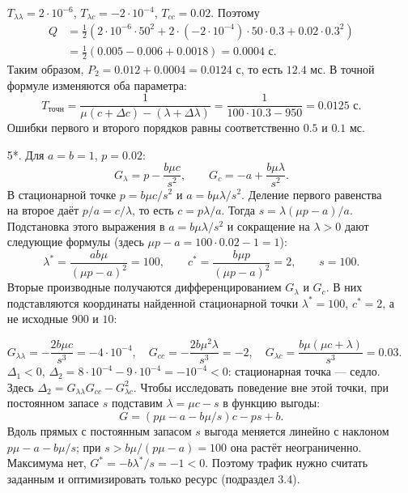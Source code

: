 \documentclass[12pt,a4paper]{article}
\begin{document}
\begin{enumerate}
$T_{\lambda\lambda}=2\cdot10^{-6}$, $T_{\lambda c}=-2\cdot10^{-4}$,
$T_{cc}=0.02$. Поэтому
\[
\begin{aligned}
Q&=\frac12\left(2\cdot10^{-6}\cdot50^2
+2\cdot(-2\cdot10^{-4})\cdot50\cdot0.3+0.02\cdot0.3^2\right)\\
&=\frac12(0.005-0.006+0.0018)=0.0004\text{ с}.
\end{aligned}
\]
Таким образом, $P_2=0.012+0.0004=0.0124$ с, то есть $12.4$ мс.
В точной формуле изменяются оба параметра:
\[
T_{\mathrm{точн}}=\frac1{\mu(c+\Delta c)-(\lambda+\Delta\lambda)}
=\frac1{100\cdot10.3-950}=0.0125\text{ с}.
\]
Ошибки первого и второго порядков равны соответственно $0.5$ и $0.1$ мс.
\item[5*.] Для $a=b=1$, $p=0.02$:
\[
G_\lambda=p-\frac{b\mu c}{s^2},\qquad G_c=-a+\frac{b\mu\lambda}{s^2}.
\]
В стационарной точке $p=b\mu c/s^2$ и $a=b\mu\lambda/s^2$.
Деление первого равенства на второе даёт $p/a=c/\lambda$, то есть
$c=p\lambda/a$. Тогда $s=\lambda(\mu p-a)/a$.
Подстановка этого выражения в $a=b\mu\lambda/s^2$ и сокращение
на $\lambda>0$ дают следующие формулы (здесь $\mu p-a=100\cdot0.02-1=1$):
\[
\lambda^*=\frac{ab\mu}{(\mu p-a)^2}=100,\qquad
c^*=\frac{b\mu p}{(\mu p-a)^2}=2,\qquad s=100.
\]
Вторые производные получаются дифференцированием $G_\lambda$ и $G_c$.
В них подставляются координаты найденной стационарной точки
$\lambda^*=100$, $c^*=2$, а не исходные $900$ и $10$:

\[
G_{\lambda\lambda}=-\frac{2b\mu c}{s^3}=-4\cdot10^{-4},\quad
G_{cc}=-\frac{2b\mu^2\lambda}{s^3}=-2,\quad
G_{\lambda c}=\frac{b\mu(\mu c+\lambda)}{s^3}=0.03.
\]
$\Delta_1<0$, $\Delta_2=8\cdot10^{-4}-9\cdot10^{-4}=-10^{-4}<0$:
стационарная точка --- седло. Здесь
$\Delta_2=G_{\lambda\lambda}G_{cc}-G_{\lambda c}^2$.
Чтобы исследовать поведение вне этой точки, при постоянном запасе $s$
подставим $\lambda=\mu c-s$ в функцию выгоды:
\[
G=(p\mu-a-b\mu/s)c-ps+b.
\]
Вдоль прямых с постоянным запасом $s$
выгода меняется линейно с наклоном $p\mu-a-b\mu/s$;
при $s>b\mu/(p\mu-a)=100$ она растёт неограниченно.
Максимума нет, $G^*=-b\lambda^*/s=-1<0$.
Поэтому трафик нужно считать заданным и оптимизировать только ресурс (подраздел 3.4).
\end{enumerate}


\newpage
\end{document}
